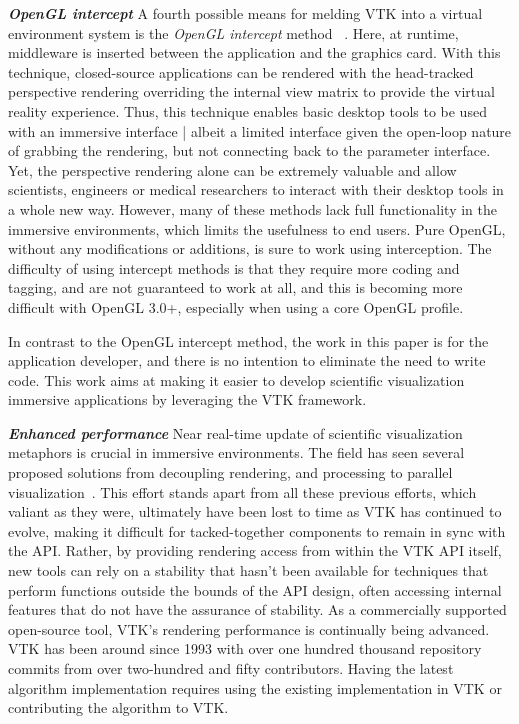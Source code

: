\textit{\textbf{OpenGL intercept}}
A fourth possible means for melding VTK into a virtual environment system
is the \textit{OpenGL intercept} method
~\cite{Humphreys:2001,Humphreys:2002,Zielinski:2014,TechViz:2016,Conduit:2016}.
Here, at runtime, middleware is inserted between the application and the graphics card.
With this technique, closed-source applications can be rendered with
the head-tracked perspective rendering overriding the internal view matrix
to provide the virtual reality experience.
Thus, this technique enables basic desktop tools to be used with an
immersive interface | albeit a limited interface given the open-loop nature of
grabbing the rendering, but not connecting back to the parameter interface.
Yet, the perspective rendering alone can be extremely valuable and allow
scientists, engineers or medical researchers to interact with their desktop
tools in a whole new way. However, many of these methods lack full functionality in the immersive environments, which limits the usefulness to end users.
Pure OpenGL, without any modifications or additions,  is sure to work using interception.
The difficulty of using intercept methods is that they require more coding
and tagging, and are not guaranteed to work at all, and this is becoming
more difficult with OpenGL 3.0+, especially when using a core OpenGL profile.

In contrast to the OpenGL intercept method, the work in this paper is for the application developer, and there is no intention to eliminate the need to write code. This work aims at making it easier to develop scientific visualization immersive applications by leveraging the VTK framework.

\textit{\textbf{Enhanced performance}} Near real-time update of scientific visualization metaphors is crucial in immersive environments.
The field has seen several proposed solutions from decoupling rendering, and processing to parallel visualization~\cite{Bryson:1996, van2000vista}.
This effort stands apart from all these previous efforts, which valiant
as they were, ultimately have been lost to time as VTK has continued to
evolve, making it difficult for tacked-together components to remain in
sync with the API.
Rather, by providing rendering access from within the VTK API itself, new
tools can rely on a stability that hasn't been available for techniques
that perform functions outside the bounds of the API design, often accessing
internal features that do not have the assurance of stability.
As a commercially supported open-source tool, VTK's rendering performance is
continually being advanced.
VTK has been around since 1993 with over one hundred thousand repository commits from over two-hundred and fifty contributors.
Having the latest algorithm implementation requires using the existing implementation in VTK or contributing the algorithm to VTK.

